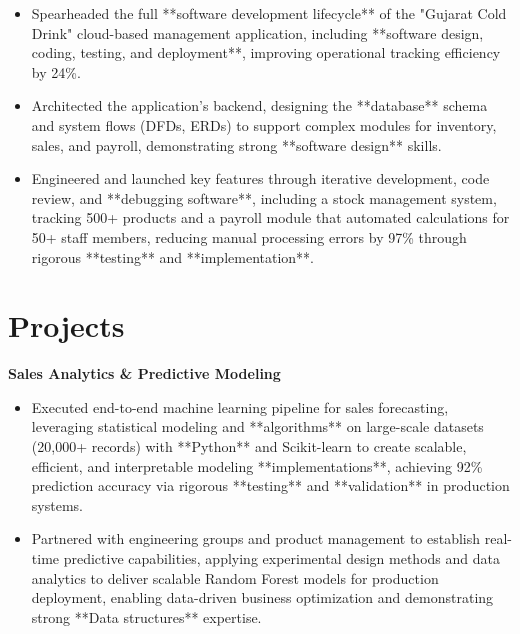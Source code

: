 \documentclass[a4paper,10pt]{article}
\begin{document}
\begin{itemize}[leftmargin=*, itemsep=0pt, parsep=1pt] %
\vspace{-7mm}
    \item Spearheaded the full **software development lifecycle** of the "Gujarat Cold Drink" cloud-based management application, including **software design, coding, testing, and deployment**, improving operational tracking efficiency by 24\%.
\item Architected the application's backend, designing the **database** schema and system flows (DFDs, ERDs) to support complex modules for inventory, sales, and payroll, demonstrating strong **software design** skills.
\item Engineered and launched key features through iterative development, code review, and **debugging software**, including a stock management system, tracking 500+ products and a payroll module that automated calculations for 50+ staff members, reducing manual processing errors by 97\% through rigorous **testing** and **implementation**.

\end{itemize}

\vspace{-4mm}

\section*{Projects}
\textbf{Sales Analytics \& Predictive Modeling} \\
\begin{itemize}[leftmargin=*, itemsep=0pt, parsep=1pt]
\vspace{-7mm}
    \item Executed end-to-end machine learning pipeline for sales forecasting, leveraging statistical modeling and **algorithms** on large-scale datasets (20,000+ records) with **Python** and Scikit-learn to create scalable, efficient, and interpretable modeling **implementations**, achieving 92\% prediction accuracy via rigorous **testing** and **validation** in production systems.
    \item Partnered with engineering groups and product management to establish real-time predictive capabilities, applying experimental design methods and data analytics to deliver scalable Random Forest models for production deployment, enabling data-driven business optimization and demonstrating strong **Data structures** expertise.
    \end{itemize}
\end{document}

